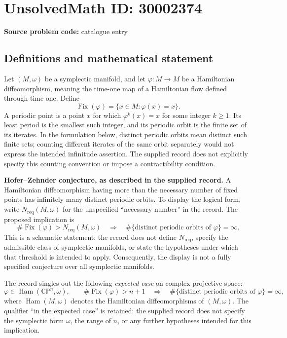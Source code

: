 \documentclass[11pt]{article}
\begin{document}
\section*{UnsolvedMath ID: 30002374}
\textbf{Source problem code:} catalogue entry
\subsection{Definitions and mathematical statement}
Let \((M,\omega)\) be a symplectic manifold, and let \(\varphi\colon M\to M\) be a Hamiltonian diffeomorphism, meaning the time-one map of a Hamiltonian flow defined through time one. Define
\[
\operatorname{Fix}(\varphi)=\{x\in M:\varphi(x)=x\}.
\]
A periodic point is a point \(x\) for which \(\varphi^k(x)=x\) for some integer \(k\geq 1\). Its least period is the smallest such integer, and its periodic orbit is the finite set of its iterates. In the formulation below, distinct periodic orbits mean distinct such finite sets; counting different iterates of the same orbit separately would not express the intended infinitude assertion. The supplied record does not explicitly specify this counting convention or impose a contractibility condition.

\textbf{Hofer--Zehnder conjecture, as described in the supplied record.} A Hamiltonian diffeomorphism having more than the necessary number of fixed points has infinitely many distinct periodic orbits. To display the logical form, write \(N_{\mathrm{req}}(M,\omega)\) for the unspecified ``necessary number'' in the record. The proposed implication is
\[
\#\operatorname{Fix}(\varphi)>N_{\mathrm{req}}(M,\omega)
\quad\Longrightarrow\quad
\#\{\text{distinct periodic orbits of }\varphi\}=\infty.
\]
This is a schematic statement: the record does not define \(N_{\mathrm{req}}\), specify the admissible class of symplectic manifolds, or state the hypotheses under which that threshold is intended to apply. Consequently, the display is not a fully specified conjecture over all symplectic manifolds.

The record singles out the following \emph{expected case} on complex projective space:
\[
\varphi\in\operatorname{Ham}(\mathbb{CP}^{n},\omega),
\qquad
\#\operatorname{Fix}(\varphi)>n+1
\quad\Longrightarrow\quad
\#\{\text{distinct periodic orbits of }\varphi\}=\infty,
\]
where \(\operatorname{Ham}(M,\omega)\) denotes the Hamiltonian diffeomorphisms of \((M,\omega)\). The qualifier ``in the expected case'' is retained: the supplied record does not specify the symplectic form \(\omega\), the range of \(n\), or any further hypotheses intended for this implication.
\end{document}
